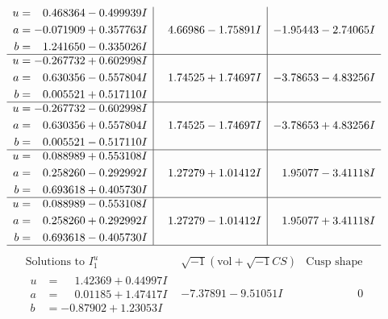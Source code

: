 \documentclass[1p]{elsarticle_modified}
\theoremstyle{definition}
\newcommand{\I}{\sqrt{-1}}
\begin{document}
$$\begin{array}{c|c|c}
\begin{aligned}
u &= \phantom{-}0.468364 - 0.499939 I \\
a &= -0.071909 + 0.357763 I \\
b &= \phantom{-}1.241650 - 0.335026 I\end{aligned}
 & \phantom{-}4.66986 - 1.75891 I & -1.95443 - 2.74065 I \\ \hline\begin{aligned}
u &= -0.267732 + 0.602998 I \\
a &= \phantom{-}0.630356 - 0.557804 I \\
b &= \phantom{-}0.005521 + 0.517110 I\end{aligned}
 & \phantom{-}1.74525 + 1.74697 I & -3.78653 - 4.83256 I \\ \hline\begin{aligned}
u &= -0.267732 - 0.602998 I \\
a &= \phantom{-}0.630356 + 0.557804 I \\
b &= \phantom{-}0.005521 - 0.517110 I\end{aligned}
 & \phantom{-}1.74525 - 1.74697 I & -3.78653 + 4.83256 I \\ \hline\begin{aligned}
u &= \phantom{-}0.088989 + 0.553108 I \\
a &= \phantom{-}0.258260 - 0.292992 I \\
b &= \phantom{-}0.693618 + 0.405730 I\end{aligned}
 & \phantom{-}1.27279 + 1.01412 I & \phantom{-}1.95077 - 3.41118 I \\ \hline\begin{aligned}
u &= \phantom{-}0.088989 - 0.553108 I \\
a &= \phantom{-}0.258260 + 0.292992 I \\
b &= \phantom{-}0.693618 - 0.405730 I\end{aligned}
 & \phantom{-}1.27279 - 1.01412 I & \phantom{-}1.95077 + 3.41118 I\\
 \hline 
 \end{array}$$\newpage$$\begin{array}{c|c|c}  
\text{Solutions to }I^u_{1}& \I (\text{vol} + \sqrt{-1}CS) & \text{Cusp shape}\\
 \hline 
\begin{aligned}
u &= \phantom{-}1.42369 + 0.44997 I \\
a &= \phantom{-}0.01185 + 1.47417 I \\
b &= -0.87902 + 1.23053 I\end{aligned}
 & -7.37891 - 9.51051 I & \phantom{-0.000000 } 0 \\ \hline\begin{aligned}

\end{aligned}
\end{array}$$
\end{document}
